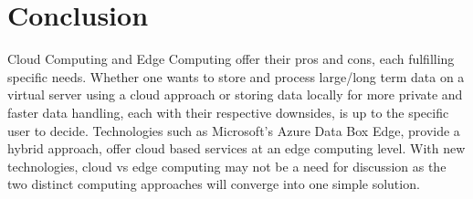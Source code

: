 \documentclass[conference]{IEEEtran}
\begin{document}
\section{Conclusion}
Cloud Computing and Edge Computing offer their pros and cons, each fulfilling specific needs. Whether one wants to store and process large/long term data on a virtual server using a cloud approach or storing data locally for more private and faster data handling, each with their respective downsides, is up to  the specific user to decide. Technologies such as Microsoft's Azure Data Box Edge, provide a hybrid approach, offer cloud based services at an edge computing level. With new technologies, cloud vs edge computing may not be a need for discussion as the two distinct computing approaches will converge into one simple solution. 
\end{document}

